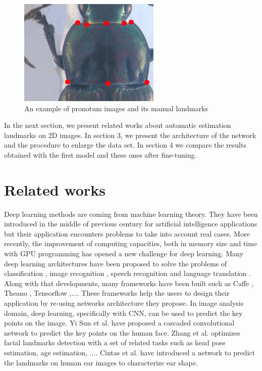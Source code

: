 \documentclass[10pt]{article}
\begin{document}
\begin{figure}[htbp]
\centering
	\centerline{\includegraphics[scale=0.7]{images/pronotum}}
	\caption{\small{An example of pronotum images and its manual landmarks}}
	\label{figpronotum}
\end{figure}

In the next section, we present related works about automatic
estimation landmarks on 2D images. In section $3$, we present the
architecture of the network and the procedure to enlarge the data
set. In section $4$ we compare the results obtained with the first
model and these ones after fine-tuning. 


\section{Related works}
Deep learning methods are coming from machine learning theory. They
have been introduced in the middle of previous century for artificial
intelligence applications but their application encounters problems to
take into account real cases. More recently, the improvement of computing capacities, both in
memory size and time with GPU programming has opened a new challenge  
for deep learning. Many deep learning architectures have been proposed
to solve the problems of classification \cite{krizhevsky2012imagenet,
  ciregan2012multi}, image recognition \cite{szegedy2015going,
  farabet2013learning, li2015convolutional}, speech recognition
\cite{mikolov2011strategies, hinton2012deep} and language translation
\cite{jean2014using, sutskever2014sequence}. Along with that
developments, many frameworks have been built such as Caffe
\cite{jia2014caffe}, Theano \cite{2016arXiv160502688short}, Tensorflow
\cite{tensorflow2015},.... These frameworks help
the users to design their application by re-using networks
architecture they propose. In image analysis domain,
deep learning, specifically with CNN, can be used to predict the key points on
the image. Yi Sun et al. \cite{sun2013deep} have proposed a cascaded
convolutional network to predict the key points on the human
face. Zhang et al. \cite{zhang2014facial} optimizes facial landmarks
detection with a set of related tasks such as head pose estimation,
age estimation, .... Cintas et al. \cite{cintas2016automatic} have
introduced a network to predict the landmarks on human ear images to
characterize ear shape.
\end{document}
